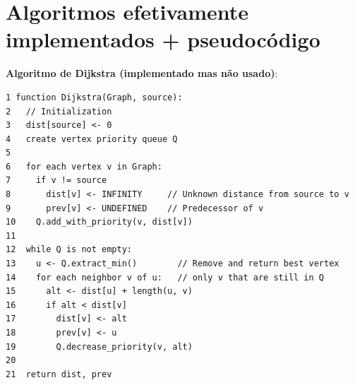 \documentclass{report}
\begin{document}
\chapter{Algoritmos efetivamente implementados + pseudocódigo}
  \textbf{Algoritmo de Dijkstra (implementado mas não usado)}:\\
  \begin{lstlisting}
1 function Dijkstra(Graph, source):
2   // Initialization
3   dist[source] <- 0
4   create vertex priority queue Q
5
6   for each vertex v in Graph:           
7     if v != source
8       dist[v] <- INFINITY     // Unknown distance from source to v
9       prev[v] <- UNDEFINED    // Predecessor of v
10    Q.add_with_priority(v, dist[v])
11
12  while Q is not empty:
13    u <- Q.extract_min()        // Remove and return best vertex
14    for each neighbor v of u:   // only v that are still in Q
15      alt <- dist[u] + length(u, v) 
16      if alt < dist[v]
17        dist[v] <- alt
18        prev[v] <- u
19        Q.decrease_priority(v, alt)
20
21  return dist, prev
  \end{lstlisting}

  \newpage
\end{document}

